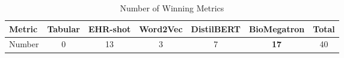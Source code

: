 \documentclass{article}
\theoremstyle{plain}
\theoremstyle{definition}
\theoremstyle{remark}
\begin{document}
\begin{table}[h!]
\caption{Number of Winning Metrics}
\label{table-daptomycin}
\vskip 0.15in
\begin{center}
\begin{small}
\begin{sc}
\begin{adjustbox}{width=5in}
\begin{tabular}{l| ccccc| c}
\toprule
Metric & Tabular & EHR-shot & Word2Vec & DistilBERT & BioMegatron & Total \\
\midrule
Number & 0 & 13 & 3 & 7 &\textbf{17} & 40\\
\bottomrule
\end{tabular}
\end{adjustbox}
\end{sc}
\end{small}
\end{center}
\vskip -0.1in
\end{table}
\end{document}
